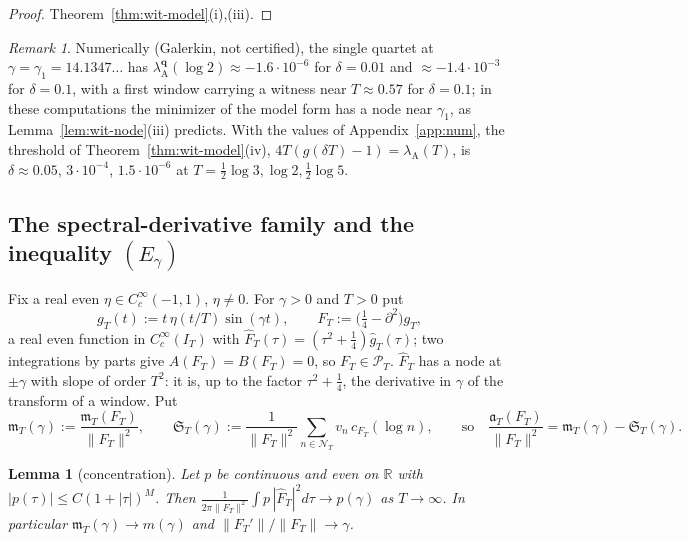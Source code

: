 \documentclass[11pt]{amsart}
\newtheorem{lemma}[theorem]{Lemma}
\theoremstyle{definition}
\theoremstyle{remark}
\newtheorem{remark}[theorem]{Remark}
\newcommand{\R}{\mathbb R}
\newcommand{\PT}{\mathcal P_T}
\newcommand{\IT}{I_T}
\newcommand{\lamA}{\lambda_{\mathrm A}(T)}
\newcommand{\Fh}{\widehat F}
\newcommand{\NT}{\mathcal N_T}
\newcommand{\mT}{\mathfrak m_T}
\begin{document}
\begin{proof}
Theorem~\ref{thm:wit-model}(i),(iii).
\end{proof}

\begin{remark}\label{rem:wit-model-num}
Numerically (Galerkin, not certified), the single quartet at $\gamma=\gamma_1=14.1347\ldots$ has
$\lambda^{\mathbf q}_{\mathrm A}(\log2)\approx-1.6\cdot10^{-6}$ for $\delta=0.01$ and $\approx-1.4\cdot10^{-3}$ for $\delta=0.1$, with a
first window carrying a witness near $T\approx0.57$ for $\delta=0.1$; in these computations the minimizer of the model form
has a node near $\gamma_1$, as Lemma~\ref{lem:wit-node}(iii) predicts. With the values of Appendix~\ref{app:num}, the
threshold of Theorem~\ref{thm:wit-model}(iv), $4T(g(\delta T)-1)=\lamA$, is $\delta\approx0.05$, $3\cdot10^{-4}$,
$1.5\cdot10^{-6}$ at $T=\frac12\log3,\log2,\frac12\log5$.
\end{remark}

\subsection{The spectral-derivative family and the inequality \texorpdfstring{$(E_\gamma)$}{(E gamma)}}
Fix a real even $\eta\in C_c^\infty(-1,1)$, $\eta\ne0$. For $\gamma>0$ and $T>0$ put
\[
g_T(t):=t\,\eta(t/T)\sin(\gamma t),\qquad F_T:=\big(\tfrac14-\partial^2\big)g_T,
\]
a real even function in $C_c^\infty(\IT)$ with $\Fh_T(\tau)=(\tau^2+\frac14)\widehat g_T(\tau)$; two integrations by parts give
$A(F_T)=B(F_T)=0$, so $F_T\in\PT$. $\Fh_T$ has a node at $\pm\gamma$ with slope of order $T^2$: it is, up to the factor
$\tau^2+\frac14$, the derivative in $\gamma$ of the transform of a window. Put
\[
\mathfrak m_T(\gamma):=\frac{\mT(F_T)}{\|F_T\|^2},\qquad \mathfrak S_T(\gamma):=\frac1{\|F_T\|^2}\sum_{n\in\NT}v_n\,c_{F_T}(\log n),\qquad
\text{so}\quad\frac{\mathfrak a_T(F_T)}{\|F_T\|^2}=\mathfrak m_T(\gamma)-\mathfrak S_T(\gamma).
\]

\begin{lemma}[concentration]\label{lem:wit-conc}
Let $p$ be continuous and even on $\R$ with $|p(\tau)|\le C(1+|\tau|)^M$. Then
$\frac1{2\pi\|F_T\|^2}\int p\,|\Fh_T|^2d\tau\to p(\gamma)$ as $T\to\infty$. In particular $\mathfrak m_T(\gamma)\to m(\gamma)$ and
$\|F_T'\|/\|F_T\|\to\gamma$.
\end{lemma}
\end{document}
